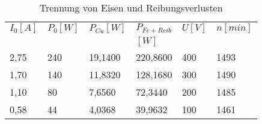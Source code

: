 \begin{table}[htbp]
    \centering
    \begin{tabularx}{\columnwidth}{XXXXXX}
        \toprule
        $I_0[A]$ &  $P_0[W]$ &  $P_{Cu}[W]$ &  $P_{Fe+Reib}$ &  $U[V]$ &  $n[min]$ \\
        & & & $[W]$& & \\
        \midrule
               2,75 &         240 &        19,1400 &            220,8600 &       400 &        1493 \\
               1,70 &         140 &        11,8320 &            128,1680 &       300 &        1490 \\
               1,10 &          80 &         7,6560 &             72,3440 &       200 &        1485 \\
               0,58 &          44 &         4,0368 &             39,9632 &       100 &        1461 \\
        \bottomrule
    \end{tabularx}
    \caption{Trennung von Eisen und Reibungsverlusten}
    \label{tab:trennung_eisen_reib}
\end{table}
